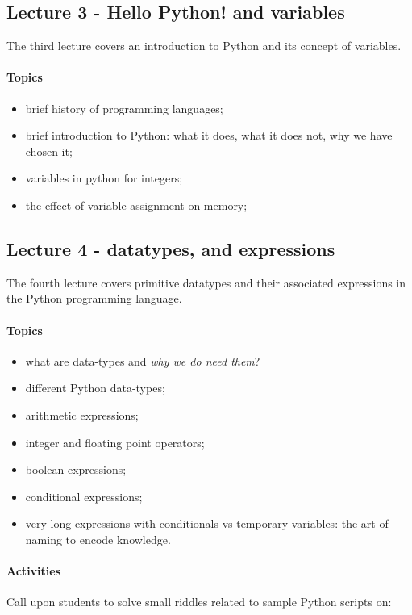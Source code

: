 			\subsection{Lecture 3 - Hello Python! and variables}
				The third lecture covers an introduction to Python and its concept of variables.

				\paragraph*{Topics}
					\begin{itemize}
						\item brief history of programming languages;
						\item brief introduction to Python: what it does, what it does not, why we have chosen it;
						\item variables in python for integers;
						\item the effect of variable assignment on memory;
					\end{itemize}

			\subsection{Lecture 4 - datatypes, and expressions}
				The fourth lecture covers primitive datatypes and their associated expressions in the Python programming language.

				\paragraph*{Topics}
					\begin{itemize}
						\item what are data-types and \textit{why we do need them}?
						\item different Python data-types;
						\item arithmetic expressions;
						\item integer and floating point operators;
						\item boolean expressions;
						\item conditional expressions;
						\item very long expressions with conditionals vs temporary variables: the art of naming to encode knowledge.
					\end{itemize}

				\paragraph*{Activities}
					Call upon students to solve small riddles related to sample Python scripts on:

